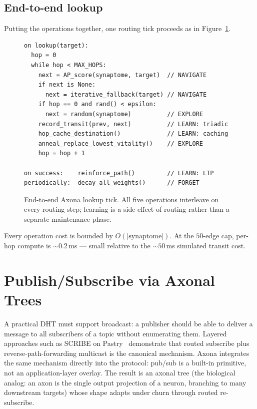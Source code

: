 \documentclass[conference]{IEEEtran}
\newcommand{\axona}{Axona\xspace}
\begin{document}
\subsection{End-to-end lookup}
\label{sec:axona-tick}

Putting the operations together, one routing tick proceeds as
in Figure~\ref{fig:tick}.

\begin{figure}[t]
{\footnotesize
\begin{verbatim}
on lookup(target):
  hop = 0
  while hop < MAX_HOPS:
    next = AP_score(synaptome, target)  // NAVIGATE
    if next is None:
      next = iterative_fallback(target) // NAVIGATE
    if hop == 0 and rand() < epsilon:
      next = random(synaptome)          // EXPLORE
    record_transit(prev, next)          // LEARN: triadic
    hop_cache_destination()             // LEARN: caching
    anneal_replace_lowest_vitality()    // EXPLORE
    hop = hop + 1

on success:    reinforce_path()         // LEARN: LTP
periodically:  decay_all_weights()      // FORGET
\end{verbatim}}
\caption{End-to-end \axona lookup tick.  All five operations
interleave on every routing step; learning is a side-effect of
routing rather than a separate maintenance phase.}
\label{fig:tick}
\end{figure}

Every operation cost is bounded by $O(|\mathrm{synaptome}|)$.
At the $50$-edge cap, per-hop compute is $\sim\!0.2$\,ms ---
small relative to the $\sim\!50$\,ms simulated transit cost.

\section{Publish/Subscribe via Axonal Trees}
\label{sec:pubsub}

A practical DHT must support broadcast: a publisher should be
able to deliver a message to all subscribers of a topic without
enumerating them.  Layered approaches such as SCRIBE on
Pastry~\cite{castro2002scribe} demonstrate that routed subscribe
plus reverse-path-forwarding multicast is the canonical
mechanism.  \axona integrates the same mechanism directly into
the protocol: pub/sub is a built-in primitive, not an
application-layer overlay.  The result is an axonal tree (the
biological analog: an axon is the single output projection of a
neuron, branching to many downstream targets) whose shape adapts
under churn through routed re-subscribe.
\end{document}
